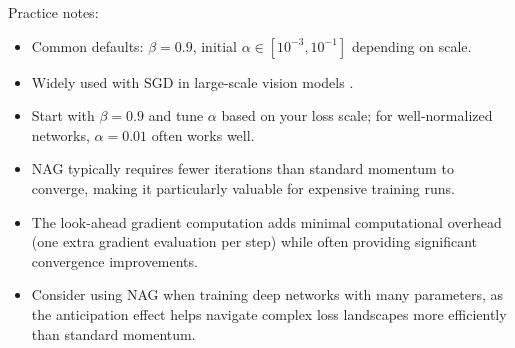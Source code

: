 Practice notes:
\begin{itemize}
    \item Common defaults: \(\beta=0.9\), initial \(\alpha\in[10^{-3},10^{-1}]\) depending on scale.
    \item Widely used with SGD in large-scale vision models \cite{He2016}.
    \item Start with \(\beta=0.9\) and tune \(\alpha\) based on your loss scale; for well-normalized networks, \(\alpha=0.01\) often works well.
    \item NAG typically requires fewer iterations than standard momentum to converge, making it particularly valuable for expensive training runs.
    \item The look-ahead gradient computation adds minimal computational overhead (one extra gradient evaluation per step) while often providing significant convergence improvements.
    \item Consider using NAG when training deep networks with many parameters, as the anticipation effect helps navigate complex loss landscapes more efficiently than standard momentum.
\end{itemize}

